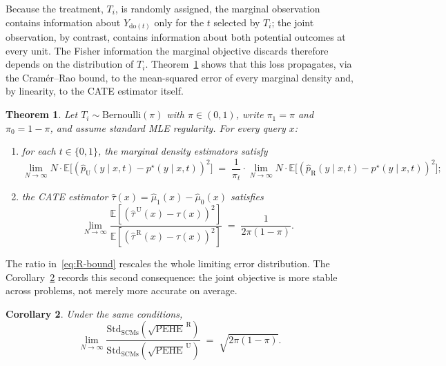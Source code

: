 \documentclass[11pt]{article}
\newtheorem{theorem}{Theorem}
\newtheorem{corollary}[theorem]{Corollary}
\newcommand{\EE}{\mathbb{E}}
\begin{document}
Because the treatment, $T_i$, is randomly assigned, the marginal observation contains information about $Y_{\mathrm{do}(t)}$ only for the $t$ selected by $T_i$; the joint observation, by contrast, contains information about both potential outcomes at every unit. The Fisher information the marginal objective discards therefore depends on the distribution of $T_i$.  Theorem~\ref{thm:efficiency} shows that this loss propagates, via the Cram\'er--Rao bound, to the mean-squared error of every marginal density and, by linearity, to the CATE estimator itself. \\


\begin{theorem}
\label{thm:efficiency}
Let $T_i \sim \mathrm{Bernoulli}(\pi)$ with $\pi \in (0, 1)$, write
$\pi_1 = \pi$ and $\pi_0 = 1 - \pi$, and assume standard MLE
regularity. For every query $x$:
\begin{enumerate}[label=(\roman*), leftmargin=1.8em]
  \item for each $t \in \{0, 1\}$, the marginal density estimators
    satisfy
    \begin{equation}
      \lim_{N \to \infty} N \cdot
        \EE\!\bigl[(\hat p_{\mathrm{U}}(y \mid x, t) - p^\star(y \mid x, t))^2\bigr]
      \;=\;
      \frac{1}{\pi_t} \cdot
      \lim_{N \to \infty} N \cdot
        \EE\!\bigl[(\hat p_{\mathrm{R}}(y \mid x, t) - p^\star(y \mid x, t))^2\bigr];
      \label{eq:marg-ratio}
    \end{equation}
  \item the CATE estimator
    $\hat\tau(x) = \hat\mu_1(x) - \hat\mu_0(x)$ satisfies
    \begin{equation}
      \lim_{N \to \infty}
        \frac{\EE[(\hat\tau^{\,\mathrm{U}}(x) - \tau(x))^2]}
             {\EE[(\hat\tau^{\,\mathrm{R}}(x) - \tau(x))^2]}
      \;=\;
      \frac{1}{2\pi(1-\pi)}.
      \label{eq:R-bound}
    \end{equation}
\end{enumerate}
\end{theorem} 

The ratio in~\eqref{eq:R-bound} rescales the whole limiting error distribution. The Corollary~\ref{cor:stability} records this second consequence: the joint objective is more stable across problems, not merely more accurate on average. \\

\begin{corollary}
\label{cor:stability}
Under the same conditions,
\[
  \lim_{N \to \infty}
    \frac{\mathrm{Std}_{\mathrm{SCMs}}(\sqrt{\mathrm{PEHE}}^{\,\mathrm{R}})}
         {\mathrm{Std}_{\mathrm{SCMs}}(\sqrt{\mathrm{PEHE}}^{\,\mathrm{U}})}
  \;=\; \sqrt{2\pi(1-\pi)}.
\]
\end{corollary} 
\end{document}
